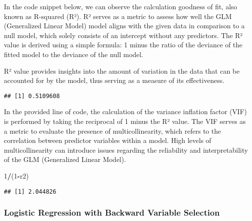 \documentclass[
]{article}
\newenvironment{Shaded}{\begin{snugshade}}{\end{snugshade}}
\newcommand{\DecValTok}[1]{\textcolor[rgb]{0.00,0.00,0.81}{#1}}
\newcommand{\FunctionTok}[1]{\textcolor[rgb]{0.13,0.29,0.53}{\textbf{#1}}}
\newcommand{\NormalTok}[1]{#1}
\newcommand{\OtherTok}[1]{\textcolor[rgb]{0.56,0.35,0.01}{#1}}
\newcommand{\SpecialCharTok}[1]{\textcolor[rgb]{0.81,0.36,0.00}{\textbf{#1}}}
\begin{document}
In the code snippet below, we can observe the calculation goodness of
fit, also known as R-squared (R²). R² serves as a metric to assess how
well the GLM (Generalized Linear Model) model aligns with the given data
in comparison to a null model, which solely consists of an intercept
without any predictors. The R² value is derived using a simple formula:
1 minus the ratio of the deviance of the fitted model to the deviance of
the null model.

R² value provides insights into the amount of variation in the data that
can be accounted for by the model, thus serving as a measure of its
effectiveness.

\begin{Shaded}
\end{Shaded}

\begin{verbatim}
## [1] 0.5109608
\end{verbatim}

In the provided line of code, the calculation of the variance inflation
factor (VIF) is performed by taking the reciprocal of 1 minus the R²
value. The VIF serves as a metric to evaluate the presence of
multicollinearity, which refers to the correlation between predictor
variables within a model. High levels of multicollinearity can introduce
issues regarding the reliability and interpretability of the GLM
(Generalized Linear Model).

\begin{Shaded}
\begin{Highlighting}[]
\DecValTok{1}\SpecialCharTok{/}\NormalTok{(}\DecValTok{1}\SpecialCharTok{{-}}\NormalTok{r2)}
\end{Highlighting}
\end{Shaded}

\begin{verbatim}
## [1] 2.044826
\end{verbatim}

\hypertarget{logistic-regression-with-backward-variable-selection}{%
\subsubsection{Logistic Regression with Backward Variable
Selection}\label{logistic-regression-with-backward-variable-selection}}
\end{document}
